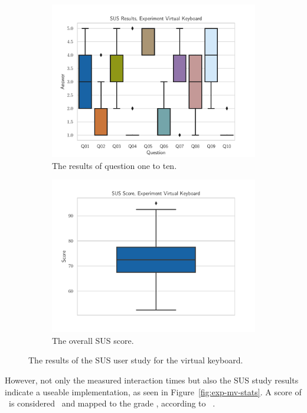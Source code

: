 \begin{figure}[H]
  \centering
  \begin{subfigure}{.45\textwidth}%
    \centering
    \includegraphics[width=\textwidth]{figures/evaluation/res_exp_vk.pdf}
    \caption{The results of question one to ten.}\label{fig:res-exp-vk}
  \end{subfigure}%
  \hspace{0.1\textwidth}%
  \begin{subfigure}{.45\textwidth}%
    \centering
    \includegraphics[width=\textwidth]{figures/evaluation/score_exp_vk.pdf}
    \caption{The overall \ac{SUS} score.}\label{fig:score-exp-vk}
  \end{subfigure}%
  \caption[User study results of the virtual keyboard experiment]{The results of the \ac{SUS} user study for the virtual keyboard.}\label{fig:exp-vk-stats}
\end{figure}

However, not only the measured interaction times but also the \ac{SUS} study results indicate a useable implementation, as seen in Figure~\ref{fig:exp-mv-stats}. A score of \evalExpVkSusScore\ is considered \evalExpVkSusAdj\ and mapped to the grade \evalExpVkSusGrade, according to \citeauthor{Bangor.2009}~\cite{Bangor.2009}.